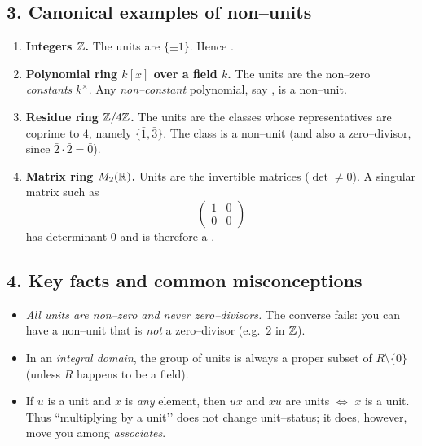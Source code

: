 \documentclass[12pt]{article}
\theoremstyle{definition} %
\theoremstyle{plain} %
\begin{document}
\medskip

\subsection*{3.  Canonical examples of non–units}

\begin{enumerate}
  \item \textbf{Integers \boldmath$\Bbb Z$.}  
        The units are $\{\pm1\}$.  
        Hence .

  \item \textbf{Polynomial ring \boldmath$k[x]$ over a field $k$.}  
        The units are the non–zero \emph{constants} $k^{\times}$.  
        Any \emph{non–constant} polynomial, say , is a non–unit.

  \item \textbf{Residue ring \boldmath$\Bbb Z/4\Bbb Z$.}  
        The units are the classes whose representatives are coprime to $4$,
        namely $\{\bar1,\bar3\}$.  
        The class  is a non–unit (and also a zero–divisor,
        since $\bar2\cdot\bar2=\bar0$).

  \item \textbf{Matrix ring $M_2(\Bbb R)$.}  
        Units are the invertible matrices ($\det\neq0$).
        A singular matrix such as
        \[
           \begin{pmatrix}1&0\\0&0\end{pmatrix}
        \]
        has determinant $0$ and is therefore a .
\end{enumerate}

\subsection*{4.  Key facts and common misconceptions}

\begin{itemize}
  \item \emph{All units are non–zero and never zero–divisors.}  
        The converse fails: you can have a non–unit that is \emph{not} a
        zero–divisor (e.g.\ $2$ in $\Bbb Z$).
  \item In an \emph{integral domain}, the group of units is always a proper
        subset of $R\setminus\{0\}$ (unless $R$ happens to be a field).
  \item If $u$ is a unit and $x$ is \emph{any} element, then $ux$ and $xu$
        are units $\Longleftrightarrow$ $x$ is a unit.  
        Thus “multiplying by a unit’’ does not change unit–status; it does,
        however, move you among \emph{associates}.
\end{itemize}
\end{document}

